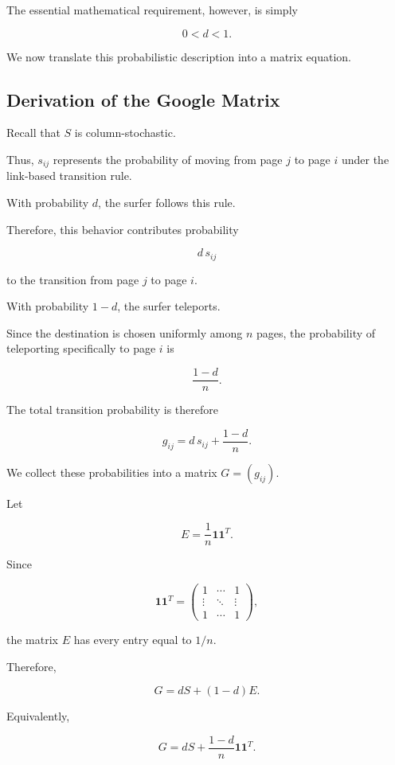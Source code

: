 \documentclass[11pt,a4paper]{article}
\theoremstyle{definition}
\theoremstyle{remark}
\begin{document}
The essential
mathematical requirement,
however, is simply

\[
0<d<1.
\]

We now translate this
probabilistic description
into a matrix equation.


\subsection{Derivation of the Google Matrix}

Recall that $S$ is
column-stochastic.

Thus, $s_{ij}$ represents
the probability of
moving from page $j$
to page $i$ under
the link-based transition rule.

With probability $d$,
the surfer follows this rule.

Therefore, this behavior
contributes probability

\[
d\,s_{ij}
\]

to the transition
from page $j$
to page $i$.

With probability $1-d$,
the surfer teleports.

Since the destination
is chosen uniformly
among $n$ pages,
the probability of
teleporting specifically
to page $i$ is

\[
\frac{1-d}{n}.
\]

The total transition
probability is therefore

\begin{equation}
g_{ij}
=
d\,s_{ij}
+
\frac{1-d}{n}.
\label{eq:google_matrix_entries}
\end{equation}

We collect these probabilities
into a matrix $G=(g_{ij})$.

Let

\[
E=
\frac1n\mathbf{1}\mathbf{1}^T.
\]

Since

\[
\mathbf{1}\mathbf{1}^T
=
\begin{pmatrix}
1&\cdots&1\\
\vdots&\ddots&\vdots\\
1&\cdots&1
\end{pmatrix},
\]

the matrix $E$ has
every entry equal to $1/n$.

Therefore,

\[
G=dS+(1-d)E.
\]

Equivalently,

\begin{equation}
\boxed{
G=
dS+
\frac{1-d}{n}
\mathbf{1}\mathbf{1}^T.
}
\label{eq:google_matrix}
\end{equation}
\end{document}
